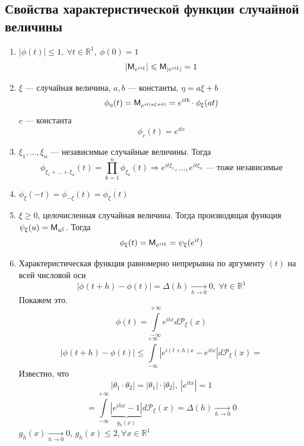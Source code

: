 \subsection{Свойства характеристической функции случайной величины}
\begin{enumerate}[wide, labelwidth=!, labelindent=0pt]
	\item $|\phi(t)| \leqslant 1, \ \forall t \in \mathbb{R}^1, \ \phi(0) = 1$ \\
\[ | \mathsf{M}_{e^{it \xi}} | \leqslant \mathsf{M}_{|e^{it \xi}|} = 1 \]
	\item $\xi$ --- случайная величина, $a, b$ --- константы, $\eta = a \xi + b$
\[
	\phi_{\eta} (t) = \mathsf{M}_{e^{it(a \xi + b)}} = e^{it b} \cdot \phi_{\xi} (at)
\]
$c$ --- константа
\[
	\phi_c (t) = e^{itc}
\]
	\item $\xi_1, \ldots, \xi_n$ --- независимые случайные величины. Тогда
\[
	\phi_{\xi_1 + \ldots + \xi_n} (t) = \prod\limits_{k = 1}^{n} \phi_{\xi_k} (t) \Rightarrow e^{it \xi_1}, \ldots, e^{it \xi_n} \text{ --- тоже независимые}
\]
\item $\phi_{\xi} (-t) = \phi_{- \xi} (t) = \overline{\phi_{\xi} (t)}$
\item $\xi \geqslant 0$, целочисленная случайная величина. Тогда производящая функция $\psi_{\xi} (u) = \mathsf{M}_{u^{\xi}}$. Тогда
\[
	\phi_{\xi} (t) = \mathsf{M}_{e^{it\xi}} = \psi_{\xi} (e^{it})
\]
\item Характеристическая функция равномерно непрерывна по аргументу $(t)$ на всей числовой оси
\[
	| \phi(t + h) - \phi(t) | = \Delta (h) \underset{h \to 0}{\rightarrow} 0, \ \forall t \in \mathbb{R}^1
\]
Покажем это.
\[
	\phi(t) = \int\limits_{-\infty}^{+\infty} e^{itx} d \mathcal{P}_{\xi} (x)
\]
\[
	| \phi (t + h) - \phi (t) | \leqslant \int\limits_{-\infty}^{+\infty} | e^{i (t + h) x} - e^{itx} | d \mathcal{P}_{\xi} (x) =
\]
Известно, что
\[
	| \theta_1 \cdot \theta_2 | = |\theta_1| \cdot | \theta_2 |, \ | e^{itx} | = 1
\]
\[
	= \int\limits_{-\infty}^{+\infty} \underbrace{| e^{ihx} - 1 |}_{g_h (x)} d \mathcal{P}_{\xi} (x) = \Delta (h) \underset{h \to 0}{\rightarrow} 0
\]
$g_h(x) \underset{h \to 0}{\rightarrow} 0$, $g_h(x) \leqslant 2, \forall x \in \mathbb{R}^1$

\end{enumerate}
